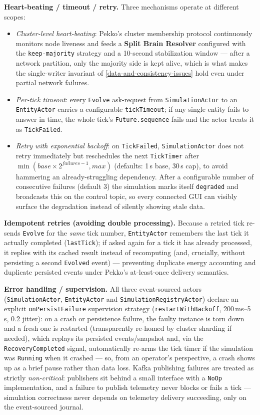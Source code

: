 \documentclass{scrreprt}
\begin{document}
\textbf{Heart-beating / timeout / retry.} Three mechanisms operate at different scopes:
\begin{itemize}
  \item \emph{Cluster-level heart-beating}: Pekko's cluster membership protocol continuously
  monitors node liveness and feeds a \textbf{Split Brain Resolver} configured with the
  \texttt{keep-majority} strategy and a 10-second stabilization window --- after a network
  partition, only the majority side is kept alive, which is what makes the single-writer
  invariant of \cref{data-and-consistency-issues} hold even under partial network failures.
  \item \emph{Per-tick timeout}: every \texttt{Evolve} ask-request from
  \texttt{SimulationActor} to an \texttt{EntityActor} carries a configurable
  \texttt{tickTimeout}; if any single entity fails to answer in time, the whole tick's
  \texttt{Future.sequence} fails and the actor treats it as \texttt{TickFailed}.
  \item \emph{Retry with exponential backoff}: on \texttt{TickFailed}, \texttt{SimulationActor}
  does not retry immediately but reschedules the next \texttt{TickTimer} after
  $\min(\mathit{base} \times 2^{\mathit{failures}-1}, \mathit{max})$ (defaults: 1\,s base,
  30\,s cap), to avoid hammering an already-struggling dependency. After a configurable number
  of consecutive failures (default 3) the simulation marks itself \texttt{degraded} and
  broadcasts this on the control topic, so every connected GUI can visibly surface the
  degradation instead of silently showing stale data.
\end{itemize}

\textbf{Idempotent retries (avoiding double processing).} Because a retried tick re-sends
\texttt{Evolve} for the \emph{same} tick number, \texttt{EntityActor} remembers the last tick
it actually completed (\texttt{lastTick}); if asked again for a tick it has already processed,
it replies with its cached result instead of recomputing (and, crucially, without persisting a
second \texttt{Evolved} event) --- preventing duplicate energy accounting and duplicate
persisted events under Pekko's at-least-once delivery semantics.

\textbf{Error handling / supervision.} All three event-sourced actors (\texttt{SimulationActor},
\texttt{EntityActor} and \texttt{SimulationRegistryActor}) declare an explicit
\texttt{onPersistFailure} supervision strategy
(\texttt{restartWithBackoff}, 200\,ms--5\,s, 0.2 jitter): on a crash or persistence failure,
the faulty instance is torn down and a fresh one is restarted (transparently re-homed by
cluster sharding if needed), which replays its persisted events/snapshot and, via the
\texttt{RecoveryCompleted} signal, automatically re-arms the tick timer if the simulation was
\texttt{Running} when it crashed --- so, from an operator's perspective, a crash shows up as a
brief pause rather than data loss. Kafka publishing failures are treated as strictly
\emph{non-critical}: publishers sit behind a small interface with a \texttt{NoOp}
implementation, and a failure to publish telemetry never blocks or fails a tick --- simulation
correctness never depends on telemetry delivery succeeding, only on the event-sourced journal.
\end{document}
